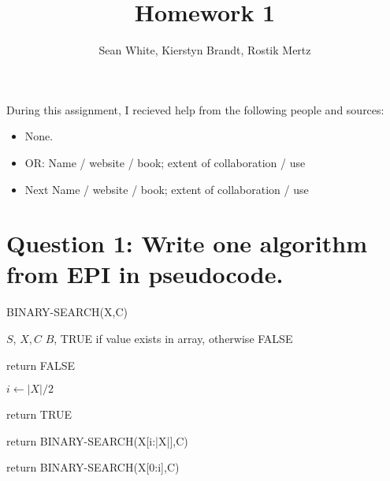 \documentclass[11pt]{article}
\title{Homework 1}
\author{Sean White, Kierstyn Brandt, Rostik Mertz}
\begin{document}
\maketitle

\noindent
During this assignment, I recieved help from the following people and sources:
\begin{itemize}
 \item None.
 \item OR: Name / website / book; extent of collaboration / use 
 \item Next Name / website / book; extent of collaboration / use 
\end{itemize}


\section*{Question 1: Write one algorithm from EPI in pseudocode.}
  \begin{algorithm}\caption{\textsc{BINARY-SEARCH(X,C)}}\label{alg:bs}
 \begin{algorithmic}[1]
    $S$, $X,C$
    $B$, TRUE if value exists in array, otherwise FALSE
   \State ~

   \State return FALSE
   \EndIf
   
   \State $i \gets |X|/2$

   \State return TRUE
   \EndIf

   \State return BINARY-SEARCH(X[i:|X|],C)
   \EndIf

   \State return BINARY-SEARCH(X[0:i],C)
   \EndIf
 \end{algorithmic}
\end{algorithm}
\end{document}
